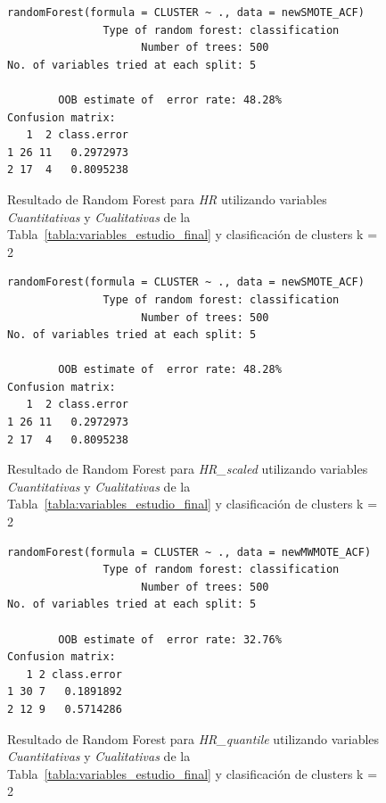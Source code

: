 \begin{figure}[H]
    \centering
    \begin{lstlisting}[frame=single, basicstyle=\small\ttfamily]
        randomForest(formula = CLUSTER ~ ., data = newSMOTE_ACF) 
               Type of random forest: classification
                     Number of trees: 500
No. of variables tried at each split: 5

        OOB estimate of  error rate: 48.28%
Confusion matrix:
   1  2 class.error
1 26 11   0.2972973
2 17  4   0.8095238
    \end{lstlisting}
    \caption{Resultado de Random Forest para \textit{HR} utilizando variables \textit{Cuantitativas} y \textit{Cualitativas} de la Tabla~\ref{tabla:variables_estudio_final} y clasificación de clusters k = 2}\label{fig:random_forest_acf_result_1}
\end{figure}
\begin{figure}[H]
    \centering
    \begin{lstlisting}[frame=single, basicstyle=\small\ttfamily]
        randomForest(formula = CLUSTER ~ ., data = newSMOTE_ACF) 
               Type of random forest: classification
                     Number of trees: 500
No. of variables tried at each split: 5

        OOB estimate of  error rate: 48.28%
Confusion matrix:
   1  2 class.error
1 26 11   0.2972973
2 17  4   0.8095238
    \end{lstlisting}
    \caption{Resultado de Random Forest para \textit{HR\_scaled} utilizando variables \textit{Cuantitativas} y \textit{Cualitativas} de la Tabla~\ref{tabla:variables_estudio_final} y clasificación de clusters k = 2}
    \label{fig:random_forest_acf_result_2}
\end{figure}

\begin{figure}[H]
    \centering
    \begin{lstlisting}[frame=single, basicstyle=\small\ttfamily]
        randomForest(formula = CLUSTER ~ ., data = newMWMOTE_ACF) 
               Type of random forest: classification
                     Number of trees: 500
No. of variables tried at each split: 5

        OOB estimate of  error rate: 32.76%
Confusion matrix:
   1 2 class.error
1 30 7   0.1891892
2 12 9   0.5714286
    \end{lstlisting}
    \caption{Resultado de Random Forest para \textit{HR\_quantile} utilizando variables \textit{Cuantitativas} y \textit{Cualitativas} de la Tabla~\ref{tabla:variables_estudio_final} y clasificación de clusters k = 2}
    \label{fig:random_forest_acf_result_3}
\end{figure}

